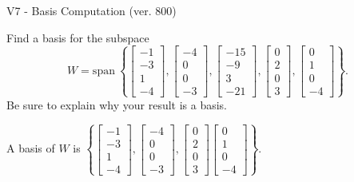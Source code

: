 \begin{exercise}
  \begin{exerciseTitle}V7 - Basis Computation (ver. 800)\end{exerciseTitle}
  \begin{exerciseStatement}
    Find a basis for the subspace 
\[W=\mathrm{span}\ \left\{\left[\begin{array}{r}
-1 \\
-3 \\
1 \\
-4
\end{array}\right] , \left[\begin{array}{r}
-4 \\
0 \\
0 \\
-3
\end{array}\right] , \left[\begin{array}{r}
-15 \\
-9 \\
3 \\
-21
\end{array}\right] , \left[\begin{array}{r}
0 \\
2 \\
0 \\
3
\end{array}\right] , \left[\begin{array}{r}
0 \\
1 \\
0 \\
-4
\end{array}\right]\right\}.\]
 Be sure to explain why your result is a basis.


  \end{exerciseStatement}
  \begin{exerciseAnswer}
   A basis of \(W\) is  \(\left\{\left[\begin{array}{r}
-1 \\
-3 \\
1 \\
-4
\end{array}\right] , \left[\begin{array}{r}
-4 \\
0 \\
0 \\
-3
\end{array}\right] , \left[\begin{array}{r}
0 \\
2 \\
0 \\
3
\end{array}\right] \left[\begin{array}{r}
0 \\
1 \\
0 \\
-4
\end{array}\right]\right\}\).
  


  \end{exerciseAnswer}
\end{exercise}